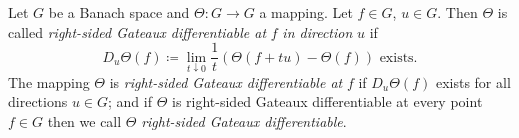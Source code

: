 \begin{definition}\label{def:b2-2.2}
Let $G$ be a Banach space and $\Theta \colon G \to G$ a mapping.
Let $f \in G$, $u \in G$.
Then $\Theta$ is called \emph{right-sided Gateaux differentiable at} $f$ \emph{in direction} $u$ if
\begin{equation}\label{eq:b2-2.3}
D_{u}\Theta(f) \coloneq \lim_{t \downarrow 0} \frac{1}{t}(\Theta(f+tu) - \Theta(f)) \text{ exists.}
\end{equation}
The mapping $\Theta$ is \emph{right-sided Gateaux differentiable at} $f$ if\/ $D_{u}\Theta(f)$ exists for all directions $u \in G$; and if\/ $\Theta$ is right-sided Gateaux differentiable at every point $f \in G$ then we call $\Theta$ \emph{right-sided Gateaux differentiable}.
\end{definition}

